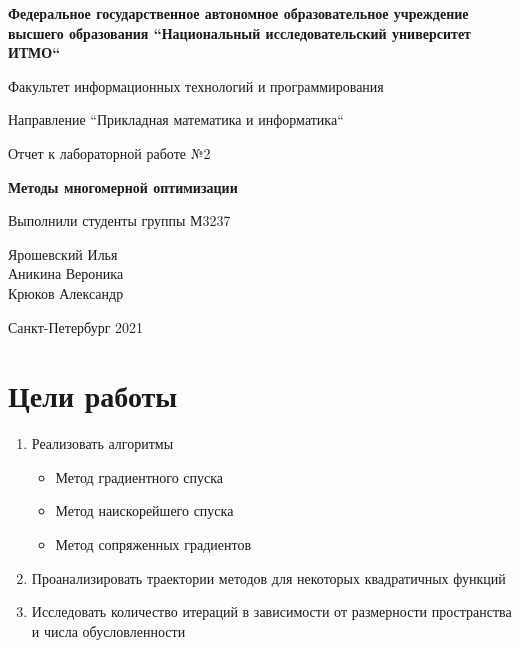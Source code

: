 \documentclass[english]{article}
\date{}
\title{}
\theoremstyle{plain}
\theoremstyle{remark}
\theoremstyle{definition}
\begin{document}
\begin{titlepage}
\begin{center}
\large\textbf{Федеральное государственное автономное образовательное учреждение высшего образования ``Национальный исследовательский университет ИТМО``} \\

\vspace{0.5cm}

Факультет информационных технологий и программирования \\

\vspace{0.5cm}

Направление ``Прикладная математика и информатика`` \\



\vspace{3cm}



Отчет к лабораторной работе №2 \\

\vspace{0.5cm}

\textbf{Методы многомерной оптимизации}
\end{center}




\vfill

\begin{flushright}
\large
Выполнили студенты группы М3237 \\

\vspace{0.5cm}

Ярошевский Илья \\
Аникина Вероника \\
Крюков Александр
\end{flushright}


\vspace{3cm}

\begin{center}
Санкт-Петербург 2021
\end{center}
\end{titlepage}



\section{Цели работы}
\label{sec:org48598f1}
\begin{enumerate}
\item Реализовать алгоритмы
\begin{itemize}
\item Метод градиентного спуска
\item Метод наискорейшего спуска
\item Метод сопряженных градиентов
\end{itemize}
\item Проанализировать траектории методов для некоторых квадратичных функций
\item Исследовать количество итераций в зависимости от размерности пространства и числа обусловленности
\end{enumerate}
\end{document}

